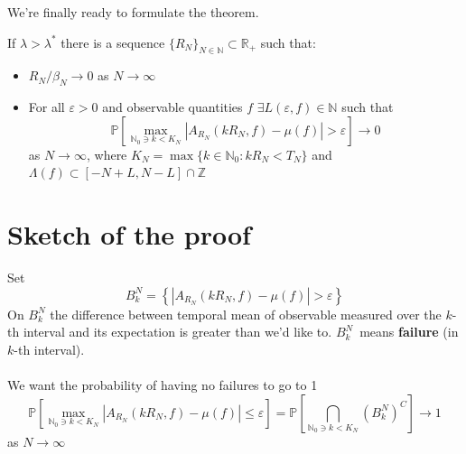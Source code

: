 \documentclass{beamer}
\begin{document}
\begin{frame}
    We're finally ready to formulate the theorem.

    \begin{theorem}[Thermalization]
        If $\lambda > \lambda^*$ there is a sequence $\{R_N\}_{N \in \mathbb{N}} \subset \mathbb{R_+}$ such that:
        \begin{itemize}
            \item $R_N/\beta_N \rightarrow 0$ as $N\rightarrow \infty$
            \item For all $\varepsilon > 0$ and observable quantities $f$ $\exists L(\varepsilon, f) \in \mathbb{N}$ such that
                  \[
                      \mathbb{P}\left[ \max_{\mathbb{N}_0 \ni k < K_N}|A_{R_N}(kR_N, f) - \mu(f)| > \varepsilon\right] \rightarrow 0
                  \]
                  as $N \rightarrow \infty$, where $K_N = \max\{k \in \mathbb{N}_0: kR_N < T_N\}$ and $\Lambda(f) \subset [-N + L, N - L] \cap \mathbb{Z}$
        \end{itemize}
    \end{theorem}
\end{frame}

\section{Sketch of the proof} %

\begin{frame}
    Set 
    \[B^N_k = \left\{ |A_{R_N}(kR_N, f) - \mu(f)| > \varepsilon\right\}\]
    On $B^N_k$ the difference between temporal mean of observable measured over the $k$-th interval and its expectation is greater than we'd like to.
    $B^N_k$~means \textbf{failure} (in $k$-th interval).
    \\~\\
    We want the probability of having no failures to go to 1
    \[\mathbb{P}\left[ \max_{\mathbb{N}_0 \ni k < K_N}|A_{R_N}(kR_N, f) - \mu(f)| \leq \varepsilon   \right] =
    \mathbb{P}\left[ \bigcap_{\mathbb{N}_0 \ni k < K_N}\left(B^N_k\right)^C \right] \rightarrow 1 \]
    as $N\rightarrow\infty$
\end{frame}
\end{document}

